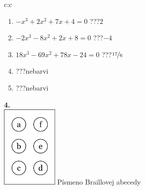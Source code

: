 \documentclass[10pt]{report}
\begin{document}
\begin{tabular}{c:c}
\begin{minipage}[c][104.5mm][t]{0.5\linewidth}
\begin{center}
\begin{minipage}{0.79\linewidth}
\begin{center}
\begin{varwidth}{\linewidth}
\begin{enumerate}
\item $-x^3+2x^2+7x+4=0$\quad \dotfill\; ???\;\dotfill \quad $2$
\item $-2x^3-8x^2+2x+8=0$\quad \dotfill\; ???\;\dotfill \quad $-4$
\item $18x^3-69x^2+78x-24=0$\quad \dotfill\; ???\;\dotfill \quad $\nicefrac{17}{6}$
\item \quad \dotfill\; ???\;\dotfill \quad nebarvi
\item \quad \dotfill\; ???\;\dotfill \quad nebarvi
\end{enumerate}
\end{varwidth}
\end{center}
\end{minipage}
\begin{minipage}{0.20\linewidth}
\begin{center}
{\Huge\bfseries 4.} \\[2mm]
\includegraphics[height=40mm]{../images/braille.png}
{\small Písmeno Braillovej abecedy}
\end{center}
\end{minipage}
\end{center}
\end{minipage}
%
\end{tabular}
\newpage
\thispagestyle{empty}
\end{document}
